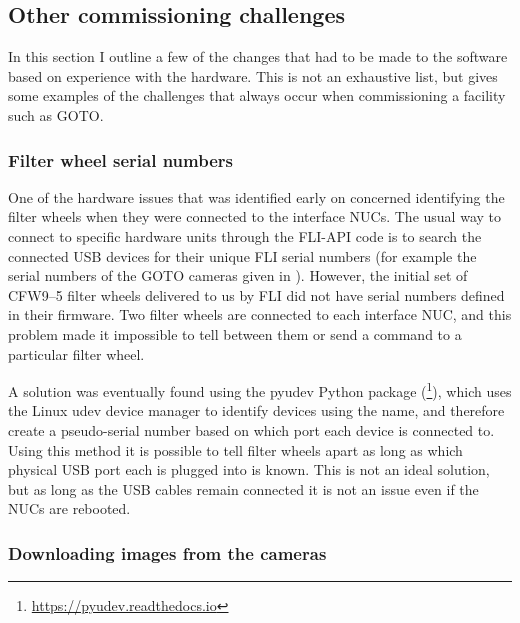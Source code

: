 \subsection{Other commissioning challenges}
\label{sec:challenges}
\begin{colsection}

In this section I outline a few of the changes that had to be made to the software based on experience with the hardware. This is not an exhaustive list, but gives some examples of the challenges that always occur when commissioning a facility such as GOTO.\@

\subsubsection{Filter wheel serial numbers}

One of the hardware issues that was identified early on concerned identifying the filter wheels when they were connected to the interface NUCs. The usual way to connect to specific hardware units through the FLI-API code is to search the connected USB devices for their unique FLI serial numbers (for example the serial numbers of the GOTO cameras given in ). However, the initial set of CFW9--5 filter wheels delivered to us by FLI did not have serial numbers defined in their firmware. Two filter wheels are connected to each interface NUC, and this problem made it impossible to tell between them or send a command to a particular filter wheel.

A solution was eventually found using the pyudev Python package (\footnote{\url{https://pyudev.readthedocs.io}}), which uses the Linux udev device manager to identify devices using the  name, and therefore create a pseudo-serial number based on which port each device is connected to. Using this method it is possible to tell filter wheels apart as long as which physical USB port each is plugged into is known. This is not an ideal solution, but as long as the USB cables remain connected it is not an issue even if the NUCs are rebooted.

\subsubsection{Downloading images from the cameras}


\end{colsection}
